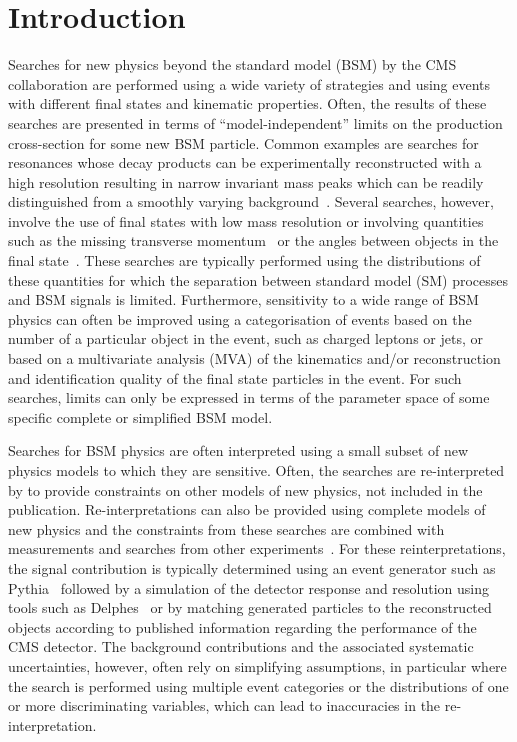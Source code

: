 \section{Introduction}
\label{sec:intro}

Searches for new physics beyond the standard model (BSM) by the CMS collaboration are performed using a wide variety of 
strategies and using events with different final states and kinematic properties.  Often, 
the results of these searches are presented in terms of ``model-independent'' limits on the production 
cross-section for some new BSM particle. Common examples are searches for resonances whose decay products 
can be experimentally reconstructed with a high resolution resulting in narrow invariant mass peaks which can be readily distinguished from 
a smoothly varying background~\cite{Khachatryan:2016yec}. Several searches, however, involve the use of final states with low mass resolution or involving 
quantities such as the missing transverse momentum~\cite{Khachatryan:2011tk,Khachatryan:2016mdm} or the angles between objects in the final state~\cite{Khachatryan:2015pua}. 
These searches are typically performed using the 
distributions of these quantities for which the separation between standard model (SM) processes and BSM signals is limited. Furthermore, 
sensitivity to a wide range of BSM physics can often be improved using a categorisation of events based on the number of a particular 
object in the event, such as charged leptons or jets, or based on a multivariate analysis (MVA) of the kinematics and/or reconstruction and 
identification quality of the final state particles in the event. For such searches, limits can only be expressed in terms of the 
parameter space of some specific complete or simplified BSM model.

Searches for BSM physics are often interpreted using a small subset of new physics 
models to which they are sensitive. Often, the searches are re-interpreted by 
to provide constraints on other models of new physics, not included in the publication.
Re-interpretations can also be provided using complete models of new physics and the constraints from 
these searches are combined with measurements and searches from other experiments~\cite{mastercode}. 
For these reinterpretations, the signal contribution is typically determined using an event generator 
such as {\sc Pythia}~\cite{pythia} followed by a simulation of the detector 
response and resolution using tools such as {\sc Delphes}~\cite{delphes} or by matching generated particles to
the reconstructed objects according to published information regarding the performance of the CMS detector. 
The background contributions and the associated systematic uncertainties, however, often rely
on simplifying assumptions, in particular where the search is performed using multiple event categories or 
the distributions of one or more discriminating variables, which can lead to inaccuracies in the re-interpretation. 

